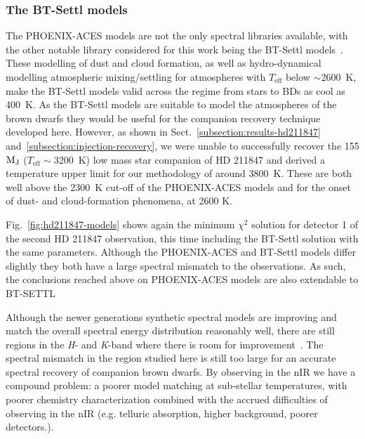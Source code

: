 \documentclass[fleqn,usenatbib]{mnras}
\newcommand*\bl{\color{blue}}
\begin{document}
    \subsubsection{The {BT-Settl} models}
    \label{subsubsec:BT-Settl}
    The PHOENIX-ACES models are not the only spectral libraries available, with the other notable library considered for this work being the {BT-Settl} models~\citep{allard_model_2010,allard_btsettl_2013,baraffe_new_2015}. These modelling of dust and cloud formation, as well as hydro-dynamical modelling atmospheric mixing/settling for atmospheres with \(T_{\textrm{eff}}\) below \(\sim\)2600~K, make the {BT-Settl} models valid across the regime from stars to BDs as cool as 400~K. As the {BT-Settl} models are suitable to model the atmospheres of the brown dwarfs they would be useful for the companion recovery technique developed here. However, as shown in Sect.~\ref{subsection:results-hd211847} and~\ref{subsection:injection-recovery}, we were unable to successfully recover the 155 \(\rm M_J\) (\(T_{\textrm{eff}}\sim\)3200~K) low mass star companion of {HD 211847} and derived a temperature upper limit for our methodology of around 3800~K. These are both well above the 2300~K cut-off of the PHOENIX-ACES models and for the onset of dust- and cloud-formation phenomena, at 2600 K.
    
    Fig.~\ref{fig:hd211847-models} shows again the minimum \(\chi^2\) solution for detector 1 of the second {HD 211847} observation, this time including the {BT-Settl} solution with the same parameters. Although the PHOENIX-ACES and {BT-Settl} models differ slightly they both have a large spectral mismatch to the observations. {\bl As such, the conclusions reached above on PHOENIX-ACES models are also extendable to BT-SETTL}
    
    Although the newer generations synthetic spectral models are improving and match the overall spectral energy distribution reasonably well, there are still regions in the \textit{H}- and \textit{K}-band where there is room for improvement~\citet{rajpurohit_spectral_2016}. The spectral mismatch in the region studied here is still too large for an accurate spectral recovery of companion brown dwarfs. {\bl By observing in the nIR we have a compound problem: a poorer model matching at sub-stellar temperatures, with poorer chemistry characterization combined with the accrued difficulties of observing in the nIR (e.g. telluric absorption, higher background, poorer detectors.)}.
    
\end{document}
